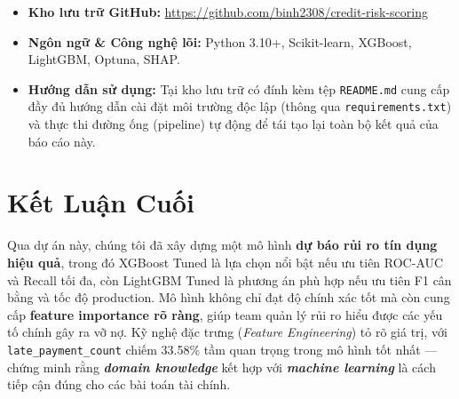 \begin{itemize}
    \item \textbf{Kho lưu trữ GitHub:} \url{https://github.com/binh2308/credit-risk-scoring}
    \item \textbf{Ngôn ngữ \& Công nghệ lõi:} Python 3.10+, Scikit-learn, XGBoost, LightGBM, Optuna, SHAP.
    \item \textbf{Hướng dẫn sử dụng:} Tại kho lưu trữ có đính kèm tệp \texttt{README.md} cung cấp đầy đủ hướng dẫn cài đặt môi trường độc lập (thông qua \texttt{requirements.txt}) và thực thi đường ống (pipeline) tự động để tái tạo lại toàn bộ kết quả của báo cáo này.
\end{itemize}

\section{Kết Luận Cuối}

Qua dự án này, chúng tôi đã xây dựng một mô hình \textbf{dự báo rủi ro tín dụng hiệu quả}, trong đó XGBoost Tuned là lựa chọn nổi bật nếu ưu tiên ROC-AUC và Recall tối đa, còn LightGBM Tuned là phương án phù hợp nếu ưu tiên F1 cân bằng và tốc độ production. Mô hình không chỉ đạt độ chính xác tốt mà còn cung cấp \textbf{feature importance rõ ràng}, giúp team quản lý rủi ro hiểu được các yếu tố chính gây ra vỡ nợ. Kỹ nghệ đặc trưng (\textit{Feature Engineering}) tỏ rõ giá trị, với \texttt{late\_payment\_count} chiếm 33.58\% tầm quan trọng trong mô hình tốt nhất --- chứng minh rằng \textit{\textbf{domain knowledge}} kết hợp với \textit{\textbf{machine learning}} là cách tiếp cận đúng cho các bài toán tài chính.